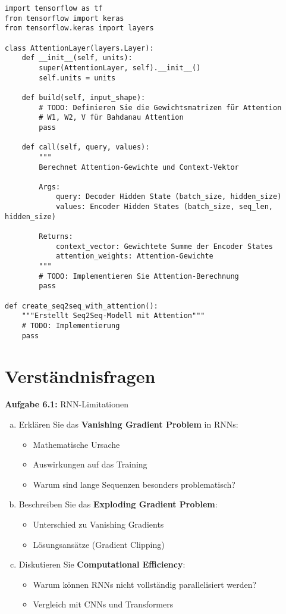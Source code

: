 \documentclass[12pt,a4paper]{article}
\begin{document}
\begin{lstlisting}[caption=Einfacher Attention-Mechanismus]
import tensorflow as tf
from tensorflow import keras
from tensorflow.keras import layers

class AttentionLayer(layers.Layer):
    def __init__(self, units):
        super(AttentionLayer, self).__init__()
        self.units = units
        
    def build(self, input_shape):
        # TODO: Definieren Sie die Gewichtsmatrizen für Attention
        # W1, W2, V für Bahdanau Attention
        pass
    
    def call(self, query, values):
        """
        Berechnet Attention-Gewichte und Context-Vektor
        
        Args:
            query: Decoder Hidden State (batch_size, hidden_size)
            values: Encoder Hidden States (batch_size, seq_len, hidden_size)
        
        Returns:
            context_vector: Gewichtete Summe der Encoder States
            attention_weights: Attention-Gewichte
        """
        # TODO: Implementieren Sie Attention-Berechnung
        pass

def create_seq2seq_with_attention():
    """Erstellt Seq2Seq-Modell mit Attention"""
    # TODO: Implementierung
    pass
\end{lstlisting}

\section{Verständnisfragen}

\textbf{Aufgabe 6.1:} RNN-Limitationen

\begin{enumerate}[(a)]
    \item Erklären Sie das \textbf{Vanishing Gradient Problem} in RNNs:
    \begin{itemize}
        \item Mathematische Ursache
        \item Auswirkungen auf das Training
        \item Warum sind lange Sequenzen besonders problematisch?
    \end{itemize}
    \item Beschreiben Sie das \textbf{Exploding Gradient Problem}:
    \begin{itemize}
        \item Unterschied zu Vanishing Gradients
        \item Lösungsansätze (Gradient Clipping)
    \end{itemize}
    \item Diskutieren Sie \textbf{Computational Efficiency}:
    \begin{itemize}
        \item Warum können RNNs nicht vollständig parallelisiert werden?
        \item Vergleich mit CNNs und Transformers
    \end{itemize}
\end{enumerate}
\end{document}
